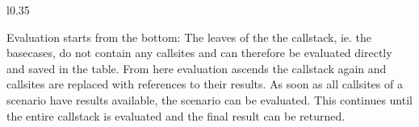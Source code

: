 
\begin{wrapfigure}{l}{0.35\linewidth}
\centering

\caption{}\label{tbl:evaluation}
\end{wrapfigure}

Evaluation starts from the bottom: The leaves of the the callstack, ie. the basecases, do not contain any callsites and can therefore be evaluated directly and saved in the table. From here evaluation ascends the callstack again and callsites are replaced with references to their results. As soon as all callsites of a scenario have results available, the scenario can be evaluated. This continues until the entire callstack is evaluated and the final result can be returned.




